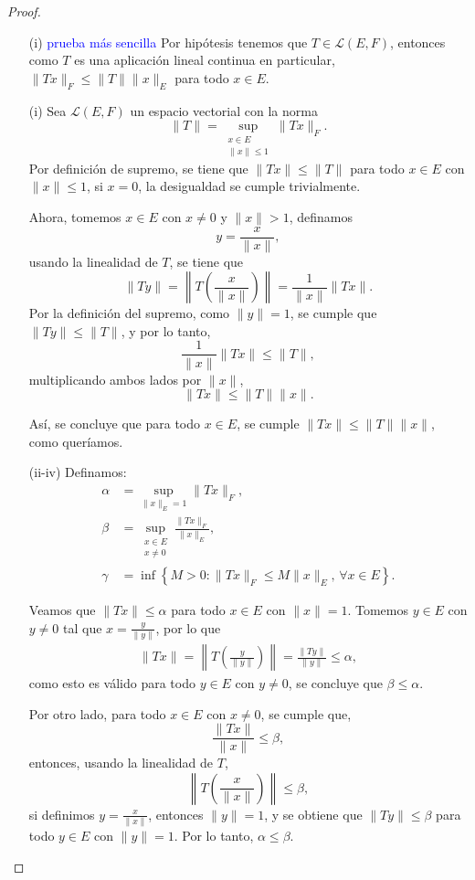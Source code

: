 \begin{proof}
\hfill
\begin{enumerate}
    \item[(i)]
    \textcolor{blue}{prueba más sencilla} Por hipótesis tenemos que $T\in \mathcal{L}(E,F)$, entonces como $T$ es una aplicación lineal continua en particular, $\|Tx\|_F\leq \|T\| \|x\|_E$ para todo $x\in E$.



 \item[(i)]Sea \(\mathcal{L}(E, F)\) un espacio vectorial con la norma
\[
\|T\| = \sup_{\substack{x \in E \\ \| x\| \leq 1}}\|Tx\|_F.
\]
Por definición de supremo, se tiene que \(\|Tx\| \leq \|T\|\) para todo \(x \in E\) con \(\|x\| \leq 1\), si \(x = 0\), la desigualdad se cumple trivialmente. 

Ahora, tomemos \(x \in E\) con \(x \neq 0\) y $\|x\|>1$, definamos
\[
y = \frac{x}{\|x\|},
\]
 usando la linealidad de \(T\), se tiene que
\[
\|Ty\| = \left\|T\left(\frac{x}{\|x\|}\right)\right\| = \frac{1}{\|x\|} \|Tx\|.
\]
Por la definición del supremo, como \(\|y\| = 1\), se cumple que \(\|Ty\| \leq \|T\|\), y por lo tanto,
\[
\frac{1}{\|x\|} \|Tx\| \leq \|T\|,
\]
multiplicando ambos lados por \(\|x\|\),
\[
\|Tx\| \leq \|T\|\|x\|.
\]

Así, se concluye que para todo \(x \in E\), se cumple \(\|Tx\| \leq \|T\|\|x\|\), como queríamos.

\item[(ii-iv)] Definamos:
\begin{align*}
    \alpha &= \sup_{\|x\|_E = 1} \|T x\|_F,\\
    \beta &= \sup_{\substack{x \in E \\ x \neq 0}} \frac{\|T x\|_F}{\|x\|_E},\\
    \gamma &= \inf \left\{ M > 0 : \|T x\|_F \leq M \|x\|_E, \, \forall x \in E \right\}.
\end{align*}

Veamos que \(\|Tx\| \leq \alpha\) para todo \(x \in E\) con \(\|x\| = 1\).  
Tomemos \(y \in E\) con \(y \neq 0\) tal que \(x = \frac{y}{\|y\|}\), por lo que
\begin{align*}
    \|Tx\| = \left\|T\left(\frac{y}{\|y\|}\right)\right\| = \frac{\|Ty\|}{\|y\|} \leq \alpha,
\end{align*}
como esto es válido para todo \(y \in E\) con \(y \neq 0\), se concluye que \(\beta \leq \alpha\).

Por otro lado, para todo \(x \in E\) con \(x \neq 0\), se cumple que,
\[
\frac{\|Tx\|}{\|x\|} \leq \beta,
\]
entonces, usando la linealidad de \(T\),
\[
\left\|T\left(\frac{x}{\|x\|}\right)\right\| \leq \beta,
\]
si definimos \(y = \frac{x}{\|x\|}\), entonces \(\|y\| = 1\), y se obtiene que \(\|Ty\| \leq \beta\) para todo \(y \in E\) con \(\|y\| = 1\). Por lo tanto, \(\alpha \leq \beta\).


\end{enumerate}
\end{proof}
